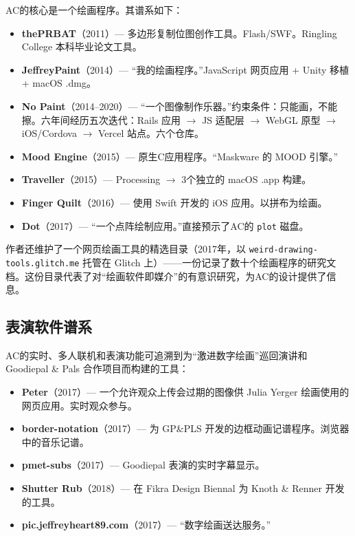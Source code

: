 \documentclass[10pt,letterpaper,twocolumn]{article}
\begin{document}
AC的核心是一个绘画程序。其谱系如下：

\begin{itemize}
  \item \textbf{thePRBAT}（2011）--- 多边形复制位图创作工具。Flash/SWF。Ringling College 本科毕业论文工具。
  \item \textbf{JeffreyPaint}（2014）--- ``我的绘画程序。''JavaScript 网页应用 + Unity 移植 + macOS .dmg。
  \item \textbf{No Paint}（2014--2020）--- ``一个图像制作乐器。''约束条件：只能画，不能擦。六年间经历五次迭代：Rails 应用 $\rightarrow$ JS 适配层 $\rightarrow$ WebGL 原型 $\rightarrow$ iOS/Cordova $\rightarrow$ Vercel 站点。六个仓库。
  \item \textbf{Mood Engine}（2015）--- 原生C应用程序。``Maskware 的 MOOD 引擎。''
  \item \textbf{Traveller}（2015）--- Processing $\rightarrow$ 3个独立的 macOS .app 构建。
  \item \textbf{Finger Quilt}（2016）--- 使用 Swift 开发的 iOS 应用。以拼布为绘画。
  \item \textbf{Dot}（2017）--- ``一个点阵绘制应用。''直接预示了AC的 \texttt{plot} 磁盘。
\end{itemize}

作者还维护了一个网页绘画工具的精选目录（2017年，以 \texttt{weird-drawing-tools.glitch.me} 托管在 Glitch 上）——一份记录了数十个绘画程序的研究文档。这份目录代表了对``绘画软件即媒介''的有意识研究，为AC的设计提供了信息。

\subsection{表演软件谱系}

AC的实时、多人联机和表演功能可追溯到为``激进数字绘画''巡回演讲和 Goodiepal \& Pals 合作项目而构建的工具：

\begin{itemize}
  \item \textbf{Peter}（2017）--- 一个允许观众上传会过期的图像供 Julia Yerger 绘画使用的网页应用。实时观众参与。
  \item \textbf{border-notation}（2017）--- 为 GP\&PLS 开发的边框动画记谱程序。浏览器中的音乐记谱。
  \item \textbf{pmet-subs}（2017）--- Goodiepal 表演的实时字幕显示。
  \item \textbf{Shutter Rub}（2018）--- 在 Fikra Design Biennal 为 Knoth \& Renner 开发的工具。
  \item \textbf{pic.jeffreyheart89.com}（2017）--- ``数字绘画送达服务。''
\end{itemize}
\end{document}

